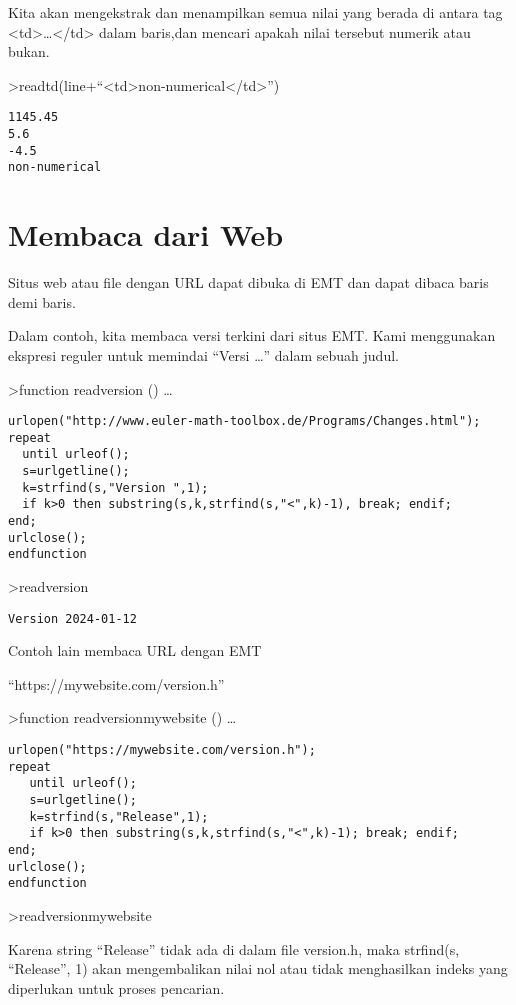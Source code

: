 \documentclass[
]{book}
\begin{document}
Kita akan mengekstrak dan menampilkan semua nilai yang berada di antara tag \textless td\textgreater\ldots\textless/td\textgreater{} dalam baris,dan mencari apakah nilai tersebut numerik atau bukan.

\textgreater readtd(line+``\textless td\textgreater non-numerical\textless/td\textgreater{}'')

\begin{verbatim}
1145.45
5.6
-4.5
non-numerical
\end{verbatim}

\chapter{Membaca dari Web}\label{membaca-dari-web}

Situs web atau file dengan URL dapat dibuka di EMT dan dapat dibaca baris demi baris.

Dalam contoh, kita membaca versi terkini dari situs EMT. Kami menggunakan ekspresi reguler untuk memindai ``Versi \ldots{}'' dalam sebuah judul.

\textgreater function readversion () \ldots{}

\begin{verbatim}
urlopen("http://www.euler-math-toolbox.de/Programs/Changes.html");
repeat
  until urleof();
  s=urlgetline();
  k=strfind(s,"Version ",1);
  if k>0 then substring(s,k,strfind(s,"<",k)-1), break; endif;
end;
urlclose();
endfunction
\end{verbatim}

\textgreater readversion

\begin{verbatim}
Version 2024-01-12
\end{verbatim}

Contoh lain membaca URL dengan EMT

``https://mywebsite.com/version.h''

\textgreater function readversionmywebsite () \ldots{}

\begin{verbatim}
urlopen("https://mywebsite.com/version.h");
repeat
   until urleof();
   s=urlgetline();
   k=strfind(s,"Release",1);
   if k>0 then substring(s,k,strfind(s,"<",k)-1); break; endif;
end;
urlclose();
endfunction
\end{verbatim}

\textgreater readversionmywebsite

Karena string ``Release'' tidak ada di dalam file version.h, maka strfind(s, ``Release'', 1) akan mengembalikan nilai nol atau tidak menghasilkan indeks yang diperlukan untuk proses pencarian.
\end{document}

